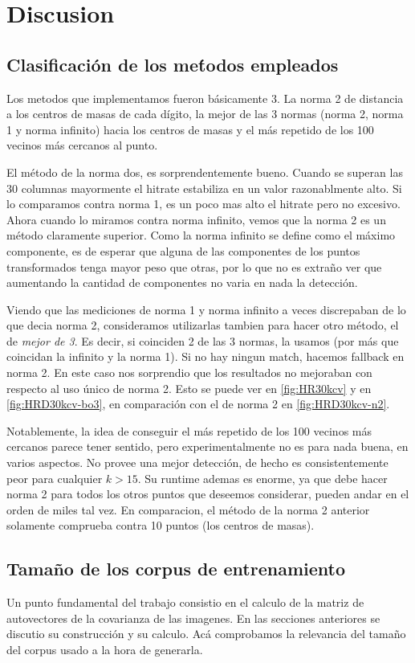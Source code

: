 \section{Discusion}


\subsection{Clasificaci\'on de los me\'todos empleados}
Los metodos que implementamos fueron b\'asicamente 3. La norma 2 de distancia a
los centros de masas de cada d\'igito, la mejor de las 3 normas (norma 2, norma 1 y norma infinito)
hacia los centros de masas y el m\'as repetido de los 100 vecinos m\'as cercanos al punto.

El m\'etodo de la norma dos, es sorprendentemente bueno. Cuando se superan las 30
columnas mayormente el hitrate estabiliza en un valor razonablmente alto. Si lo
comparamos contra norma 1, es un poco mas alto el hitrate pero no excesivo. Ahora
cuando lo miramos contra norma infinito, vemos que la norma 2 es un m\'etodo
claramente superior. Como la norma infinito se define como el m\'aximo componente,
es de esperar que alguna de las componentes de los puntos transformados tenga mayor
peso que otras, por lo que no es extra\~no ver que aumentando la cantidad de componentes
no varia en nada la detecci\'on.

Viendo que las mediciones de norma 1 y norma infinito a veces discrepaban de lo que
decia norma 2, consideramos utilizarlas tambien para hacer otro m\'etodo, el de \textit{mejor
de 3}. Es decir, si coinciden 2 de las 3 normas, la usamos (por m\'as que coincidan la
infinito y la norma 1). Si no hay ningun match, hacemos fallback en norma 2. En este caso
nos sorprendio que los resultados no mejoraban con respecto al uso \'unico de norma 2.
Esto se puede ver en \ref{fig:HR30kcv} y en \ref{fig:HRD30kcv-bo3}, en comparaci\'on con
el de norma 2 en \ref{fig:HRD30kcv-n2}.

Notablemente, la idea de conseguir el m\'as repetido de los 100 vecinos m\'as cercanos
parece tener sentido, pero experimentalmente no es para nada buena, en varios aspectos.
No provee una mejor detecci\'on, de hecho es consistentemente peor para cualquier $k>15$.
Su runtime ademas es enorme, ya que debe hacer norma 2 para todos los otros puntos que
deseemos considerar, pueden andar en el orden de miles tal vez. En comparacion, el m\'etodo
de la norma 2 anterior solamente comprueba contra 10 puntos (los centros de masas).


\subsection{Tama\~no de los corpus de entrenamiento }
Un punto fundamental del trabajo consistio en el calculo de la matriz de autovectores
de la covarianza de las imagenes. En las secciones anteriores se discutio su construcci\'on
y su calculo. Ac\'a comprobamos la relevancia del tama\~no del corpus usado a la hora
de generarla.

